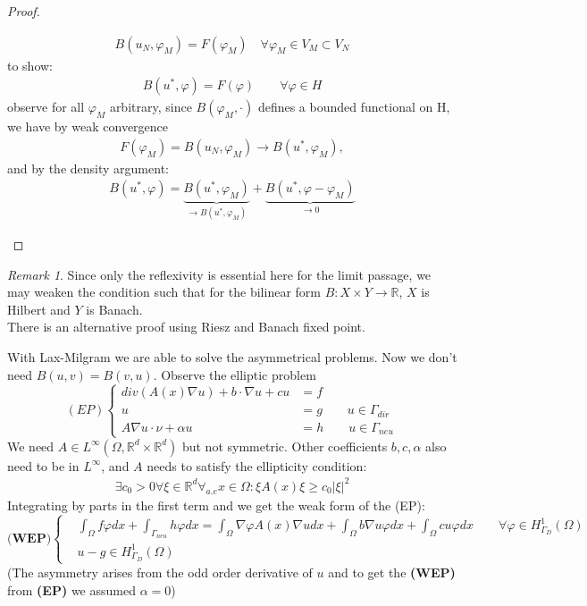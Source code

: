 \documentclass[a4paper,11pt,oneside,fleqn]{book}
\theoremstyle{definition}
\theoremstyle{remark}
\newtheorem*{remark}{Remark}
\begin{document}
\begin{proof}
\begin{itemize}
\begin{align*}
	B(u_N, \varphi_M) = F(\varphi_M) \quad \forall \varphi_M \in V_M \subset V_N
\end{align*}
to show:
\begin{align*}
	B(u^*, \varphi) = F(\varphi) \qquad \forall \varphi \in H
\end{align*}
observe for all $\varphi_M$ arbitrary, since $B(\varphi_M, \cdot)$ defines a bounded functional on H, we have by weak convergence
\begin{align*}
	F(\varphi_M) = B(u_N, \varphi_M) \longrightarrow B(u^*, \varphi_M),
\end{align*}
and by the density argument:
\begin{align*}
	B(u^*, \varphi) = \underbrace{ B(u^*, \varphi_M)}_{\rightarrow B(u^*, \varphi_M) } + \underbrace{ B(u^*, \varphi - \varphi_M)}_{\rightarrow 0}
\end{align*}
\end{itemize}
\end{proof}
\begin{remark}
Since only the reflexivity is essential here for the limit passage, we may weaken the condition such that for the bilinear form $B: X \times Y \rightarrow \mathbb{R}$, $X$ is Hilbert and $Y$ is Banach.\\
There is an alternative proof using Riesz and Banach fixed point. 	
\end{remark}



With Lax-Milgram we are able to solve the asymmetrical problems. Now we don't need $B(u, v) = B(v, u)$. Observe the elliptic problem
\begin{equation}\label{EP}
(EP)\left\{
\begin{aligned}
	div(A(x)\nabla u) + b\cdot \nabla u + cu &= f \\
	u &= g \qquad u \in \Gamma_{dir}\\
	A\nabla u \cdot \nu + \alpha u &= h \qquad u \in \Gamma_{neu}
\end{aligned}
\right.
\end{equation}
We need $A \in L^\infty(\Omega, \mathbb{R}^d \times \mathbb{R}^d)$ but not symmetric. Other coefficients $b, c, \alpha$ also need to be in $L^\infty$, and $A$ needs to satisfy the ellipticity condition:
\begin{align*}
	\exists c_0 > 0 \forall \xi \in \mathbb{R}^d \forall_{a.e} x \in \Omega: \xi A(x) \xi \geq c_0 |\xi|^2
\end{align*} 
Integrating by parts in the first term and we get the weak form of the (EP):
\begin{equation}\label{EP:WEP}
\textbf{(WEP)}\left\{
\begin{aligned}
	&\int_\Omega f\varphi dx + \int_{\Gamma_{neu}} h \varphi dx = \int_\Omega \nabla\varphi A(x)\nabla u dx + \int_\Omega b\nabla u \varphi dx + \int_\Omega cu \varphi dx \qquad \forall \varphi \in H^1_{\Gamma_D}(\Omega) \\
	&u - g \in H^1_{\Gamma_{D}}(\Omega)
\end{aligned}
\right.	
\end{equation}
(The asymmetry arises from the odd order derivative of $u$ and to get the \textbf{(WEP)} from \textbf{(EP)} we assumed $\alpha = 0$) 
\end{document}
